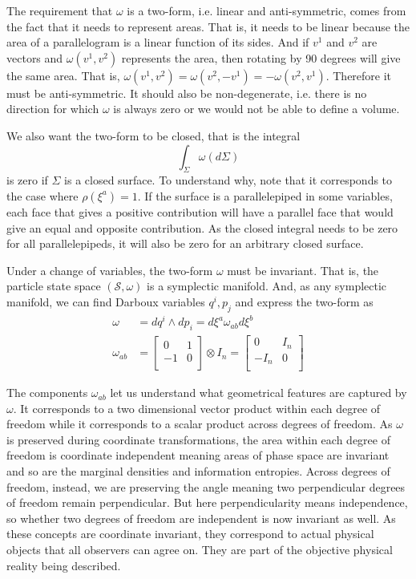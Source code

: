 \documentclass[11pt]{elsarticle}
\begin{document}
The requirement that $\omega$ is a two-form, i.e. linear and anti-symmetric, comes from the fact that it needs to represent areas. That is, it needs to be linear because the area of a parallelogram is a linear function of its sides. And if $v^1$ and $v^2$ are vectors and $\omega(v^1, v^2)$ represents the area, then rotating by 90 degrees will give the same area. That is, $\omega(v^1, v^2) = \omega(v^2, -v^1) = -\omega(v^2, v^1)$. Therefore it must be anti-symmetric. It should also be non-degenerate, i.e. there is no direction for which $\omega$ is always zero or we would not be able to define a volume.

We also want the two-form to be closed, that is the integral
\begin{equation}
\int_\Sigma \omega(d\Sigma)
\end{equation}
is zero if $\Sigma$ is a closed surface. To understand why, note that it corresponds to the case where $\rho(\xi^a)=1$. If the surface is a parallelepiped in some variables, each face that gives a positive contribution will have a parallel face that would give an equal and opposite contribution. As the closed integral needs to be zero for all parallelepipeds, it will also be zero for an arbitrary closed surface.

Under a change of variables, the two-form $\omega$ must be invariant. That is, the particle state space $(\mathcal{S}, \omega)$ is a symplectic manifold. And, as any symplectic manifold, we can find Darboux variables $q^i, p_j$ and express the two-form as
\begin{equation}
\label{Symplectic}
\begin{aligned}
\omega &= dq^i \wedge dp_i = d\xi^a\omega_{ab}d\xi^b \\
\omega_{ab} &=  \left[
\begin{array}{cc}
0 & 1 \\
-1 & 0 \\
\end{array}
\right] \otimes I_n =
\left[
\begin{array}{cc}
0 & I_n \\
-I_n & 0 \\
\end{array}
\right]
\end{aligned}
\end{equation}

The components $\omega_{ab}$ let us understand what geometrical features are captured by $\omega$. It corresponds to a two dimensional vector product within each degree of freedom while it corresponds to a scalar product across degrees of freedom. As $\omega$ is preserved during coordinate transformations, the area within each degree of freedom is coordinate independent meaning areas of phase space are invariant and so are the marginal densities and information entropies. Across degrees of freedom, instead, we are preserving the angle meaning two perpendicular degrees of freedom remain perpendicular. But here perpendicularity means independence, so whether two degrees of freedom are independent is now invariant as well. As these concepts are coordinate invariant, they correspond to actual physical objects that all observers can agree on. They are part of the objective physical reality being described.
\end{document}
